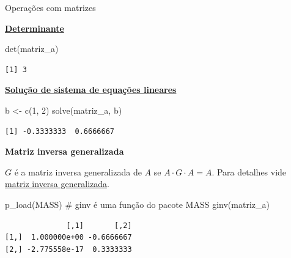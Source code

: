 \documentclass[
  10pt,
  ignorenonframetext,
]{beamer}
\newenvironment{Shaded}{\begin{snugshade}}{\end{snugshade}}
\newcommand{\CommentTok}[1]{\textcolor[rgb]{0.37,0.37,0.37}{#1}}
\newcommand{\DecValTok}[1]{\textcolor[rgb]{0.68,0.00,0.00}{#1}}
\newcommand{\FunctionTok}[1]{\textcolor[rgb]{0.28,0.35,0.67}{#1}}
\newcommand{\NormalTok}[1]{\textcolor[rgb]{0.00,0.23,0.31}{#1}}
\newcommand{\OtherTok}[1]{\textcolor[rgb]{0.00,0.23,0.31}{#1}}
\begin{document}
\begin{frame}[fragile]{Operações com matrizes}
\protect\hypertarget{operauxe7uxf5es-com-matrizes-3}{}
\small

\href{https://pt.wikipedia.org/wiki/Determinante}{\textbf{Determinante}}

\begin{Shaded}
\begin{Highlighting}[]
\FunctionTok{det}\NormalTok{(matriz\_a)}
\end{Highlighting}
\end{Shaded}

\begin{verbatim}
[1] 3
\end{verbatim}

\href{https://pt.wikipedia.org/wiki/Sistema_de_equações_lineares}{\textbf{Solução
de sistema de equações lineares}}

\begin{Shaded}
\begin{Highlighting}[]
\NormalTok{b }\OtherTok{\textless{}{-}} \FunctionTok{c}\NormalTok{(}\DecValTok{1}\NormalTok{, }\DecValTok{2}\NormalTok{)}
\FunctionTok{solve}\NormalTok{(matriz\_a, b)}
\end{Highlighting}
\end{Shaded}

\begin{verbatim}
[1] -0.3333333  0.6666667
\end{verbatim}

\textbf{Matriz inversa generalizada}

\(G\) é a matriz inversa generalizada de \(A\) se
\(A \cdot G \cdot A = A\). Para detalhes vide
\href{https://en.wikipedia.org/wiki/Generalized_inverse}{matriz inversa
generalizada}.

\begin{Shaded}
\begin{Highlighting}[]
\FunctionTok{p\_load}\NormalTok{(MASS) }\CommentTok{\# ginv é uma função do pacote MASS}
\FunctionTok{ginv}\NormalTok{(matriz\_a)}
\end{Highlighting}
\end{Shaded}

\begin{verbatim}
              [,1]       [,2]
[1,]  1.000000e+00 -0.6666667
[2,] -2.775558e-17  0.3333333
\end{verbatim}

\normalsize
\end{frame}
\end{document}
